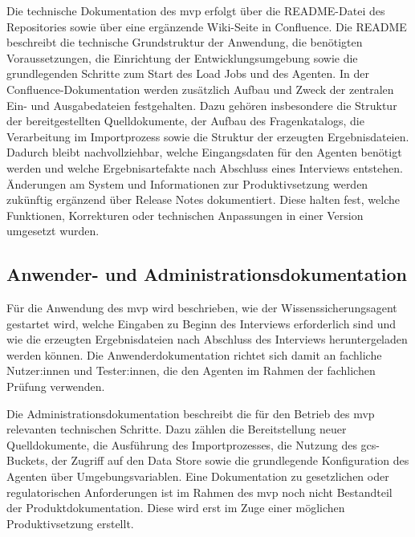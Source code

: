 \documentclass[
  10pt,
  ngerman,
  a4paper,
  toc=graduated,
  numbers=noenddot,
  headings=standardclasses,
  nonumberlist
]{scrartcl}
\begin{document}
Die technische Dokumentation des \gls{mvp} erfolgt über die README-Datei des Repositories sowie über eine ergänzende Wiki-Seite in Confluence. Die README beschreibt die technische Grundstruktur der Anwendung, die benötigten Voraussetzungen, die Einrichtung der Entwicklungsumgebung sowie die grundlegenden Schritte zum Start des Load Jobs und des Agenten. In der Confluence-Dokumentation werden zusätzlich Aufbau und Zweck der zentralen Ein- und Ausgabedateien festgehalten. Dazu gehören insbesondere die Struktur der bereitgestellten Quelldokumente, der Aufbau des Fragenkatalogs, die Verarbeitung im Importprozess sowie die Struktur der erzeugten Ergebnisdateien. Dadurch bleibt nachvollziehbar, welche Eingangsdaten für den Agenten benötigt werden und welche Ergebnisartefakte nach Abschluss eines Interviews entstehen. Änderungen am System und Informationen zur Produktivsetzung werden zukünftig ergänzend über Release Notes dokumentiert. Diese halten fest, welche Funktionen, Korrekturen oder technischen Anpassungen in einer Version umgesetzt wurden.

\subsection{Anwender- und Administrationsdokumentation}
\label{anwender_und_administrationsdokumentation}

Für die Anwendung des \gls{mvp} wird beschrieben, wie der Wissenssicherungsagent gestartet wird, welche Eingaben zu Beginn des Interviews erforderlich sind und wie die erzeugten Ergebnisdateien nach Abschluss des Interviews heruntergeladen werden können. Die Anwenderdokumentation richtet sich damit an fachliche Nutzer:innen und Tester:innen, die den Agenten im Rahmen der fachlichen Prüfung verwenden.

Die Administrationsdokumentation beschreibt die für den Betrieb des \gls{mvp} relevanten technischen Schritte. Dazu zählen die Bereitstellung neuer Quelldokumente, die Ausführung des Importprozesses, die Nutzung des \gls{gcs}-Buckets, der Zugriff auf den Data Store sowie die grundlegende Konfiguration des Agenten über Umgebungsvariablen. Eine Dokumentation zu gesetzlichen oder regulatorischen Anforderungen ist im Rahmen des \gls{mvp} noch nicht Bestandteil der Produktdokumentation. Diese wird erst im Zuge einer möglichen Produktivsetzung erstellt.
\end{document}

